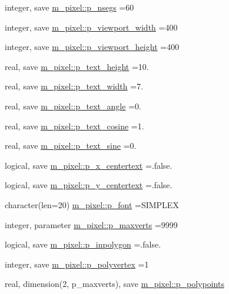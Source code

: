 \begin{DoxyCompactItemize}
integer, save \mbox{\hyperlink{namespacem__pixel_ace7c28c9ae8a890cac3c7fc2d3c2e824}{m\+\_\+pixel\+::p\+\_\+nsegs}} =60
\item 
integer, save \mbox{\hyperlink{namespacem__pixel_adaf071a7cca5f7d4404d59c17739fcf3}{m\+\_\+pixel\+::p\+\_\+viewport\+\_\+width}} =400
\item 
integer, save \mbox{\hyperlink{namespacem__pixel_acf14b658781bda49f8d06960898145e1}{m\+\_\+pixel\+::p\+\_\+viewport\+\_\+height}} =400
\item 
real, save \mbox{\hyperlink{namespacem__pixel_a537c6094f5f61e3244c7e380824f303e}{m\+\_\+pixel\+::p\+\_\+text\+\_\+height}} =10.
\item 
real, save \mbox{\hyperlink{namespacem__pixel_adc146e2cd2855f33422e2c11ca1ba7ce}{m\+\_\+pixel\+::p\+\_\+text\+\_\+width}} =7.
\item 
real, save \mbox{\hyperlink{namespacem__pixel_a3b1c231e0814986c5d095cbd4297c816}{m\+\_\+pixel\+::p\+\_\+text\+\_\+angle}} =0.
\item 
real, save \mbox{\hyperlink{namespacem__pixel_a85337ee8045620104d3dc7c63cc0cbdb}{m\+\_\+pixel\+::p\+\_\+text\+\_\+cosine}} =1.
\item 
real, save \mbox{\hyperlink{namespacem__pixel_afa488842d93c6af90f0acc87f36c8a84}{m\+\_\+pixel\+::p\+\_\+text\+\_\+sine}} =0.
\item 
logical, save \mbox{\hyperlink{namespacem__pixel_afbac34f0dc57e0da0666b52c238ea37c}{m\+\_\+pixel\+::p\+\_\+x\+\_\+centertext}} =.false.
\item 
logical, save \mbox{\hyperlink{namespacem__pixel_a7f2859a8ac00324dff9d055b83bd17d2}{m\+\_\+pixel\+::p\+\_\+y\+\_\+centertext}} =.false.
\item 
character(len=20) \mbox{\hyperlink{namespacem__pixel_a06bbf83bc5125cad5aba0af267af0e18}{m\+\_\+pixel\+::p\+\_\+font}} =\textquotesingle{}S\+I\+M\+P\+L\+EX\textquotesingle{}
\item 
integer, parameter \mbox{\hyperlink{namespacem__pixel_ac1b53fdfda87eb9ede10e72973344e25}{m\+\_\+pixel\+::p\+\_\+maxverts}} =9999
\item 
logical, save \mbox{\hyperlink{namespacem__pixel_a1911f94cdfa5a7c08ff32a696d2ea51e}{m\+\_\+pixel\+::p\+\_\+inpolygon}} =.false.
\item 
integer, save \mbox{\hyperlink{namespacem__pixel_ac0759567a2205be55bc4c9b8b7b6d5d5}{m\+\_\+pixel\+::p\+\_\+polyvertex}} =1
\item 
real, dimension(2, p\+\_\+maxverts), save \mbox{\hyperlink{namespacem__pixel_ab5c7f104a86e11630f363a26a1cb7067}{m\+\_\+pixel\+::p\+\_\+polypoints}}

\end{DoxyCompactItemize}
